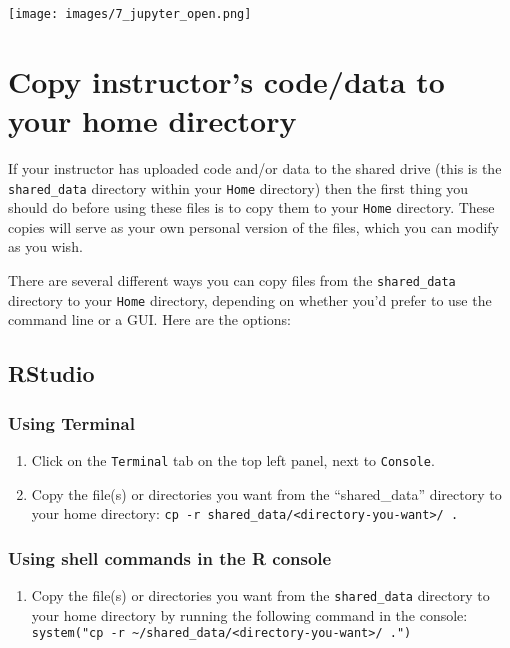 \documentclass[]{book}
\providecommand{\tightlist}{%
  \setlength{\itemsep}{0pt}\setlength{\parskip}{0pt}}
\begin{document}
\texttt{[image: images/7\_jupyter\_open.png]}

\hypertarget{copy-instructors-codedata-to-your-home-directory}{%
\chapter{Copy instructor's code/data to your home directory}\label{copy-instructors-codedata-to-your-home-directory}}

If your instructor has uploaded code and/or data to the shared drive (this is the \texttt{shared\_data} directory within your \texttt{Home} directory) then the first thing you should do before using these files is to copy them to your \texttt{Home} directory. These copies will serve as your own personal version of the files, which you can modify as you wish.

There are several different ways you can copy files from the \texttt{shared\_data} directory to your \texttt{Home} directory, depending on whether you'd prefer to use the command line or a GUI. Here are the options:

\hypertarget{rstudio-1}{%
\section{RStudio}\label{rstudio-1}}

\hypertarget{using-terminal}{%
\subsection{Using Terminal}\label{using-terminal}}

\begin{enumerate}
\def\labelenumi{\arabic{enumi}.}
\tightlist
\item
  Click on the \texttt{Terminal} tab on the top left panel, next to \texttt{Console}.
\item
  Copy the file(s) or directories you want from the ``shared\_data'' directory to your home directory: \texttt{cp\ -r\ shared\_data/\textless{}directory-you-want\textgreater{}/\ .}
\end{enumerate}

\hypertarget{using-shell-commands-in-the-r-console}{%
\subsection{Using shell commands in the R console}\label{using-shell-commands-in-the-r-console}}

\begin{enumerate}
\def\labelenumi{\arabic{enumi}.}
\tightlist
\item
  Copy the file(s) or directories you want from the \texttt{shared\_data} directory to your home directory by running the following command in the console: \texttt{system("cp\ -r\ \textasciitilde{}/shared\_data/\textless{}directory-you-want\textgreater{}/\ .")}
\end{enumerate}
\end{document}

